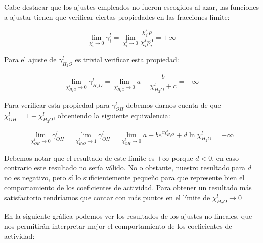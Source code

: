 \documentclass[a4paper,12pt,titlepage]{article}
\begin{document}
Cabe destacar que los ajustes empleados no fueron escogidos al azar, las funciones a ajustar tienen que verificar ciertas propiedades en las fracciones límite:

\begin{equation}
    \lim_{\chi_i^l \to 0} \gamma_i^l = \lim_{\chi_i^l \to 0} \frac{\chi_i^v p}{\chi_i^l p_i^0} = +\infty
\end{equation}

Para el ajuste de $\gamma_{H_2O}^l$ es trivial verificar esta propiedad:

\begin{equation}
    \lim_{\chi_{H_2O}^l \to 0} \gamma_{H_2O}^l =  \lim_{\chi_{H_2O}^l \to 0} a + \frac{b}{\chi_{H_2O}^l + c} = +\infty
\end{equation}

Para  verificar esta propiedad para $\gamma_{OH}^l$ debemos darnos cuenta de que $\chi_{OH}^l = 1 - \chi_{H_2O}^l$, obteniendo la siguiente equivalencia:

\begin{equation}
    \lim_{\chi_{OH}^l \to 0} \gamma_{OH}^l = \lim_{\chi_{H_2O}^l \to 1} \gamma_{OH}^l =  \lim_{\chi_{OH}^l \to 0} a + be^{c\chi_{H_2O}^l} + d \ln \chi_{H_2O}^l = +\infty
\end{equation}

Debemos notar que el resultado de este límite es $+\infty$ porque $d<0$, en caso contrario este resultado no sería válido. No o obstante, nuestro resultado para $d$ no es negativo, pero sí lo suficientemente pequeño para que represente bien el comportamiento de los coeficientes de actividad. Para obtener un resultado más satisfactorio tendríamos que contar con más puntos en el límite de $\chi_{H_2O}^l \to 0$

En la siguiente gráfica podemos ver los resultados de los ajustes no lineales, que nos permitirán interpretar mejor el comportamiento de los coeficientes de actividad:
\end{document}
